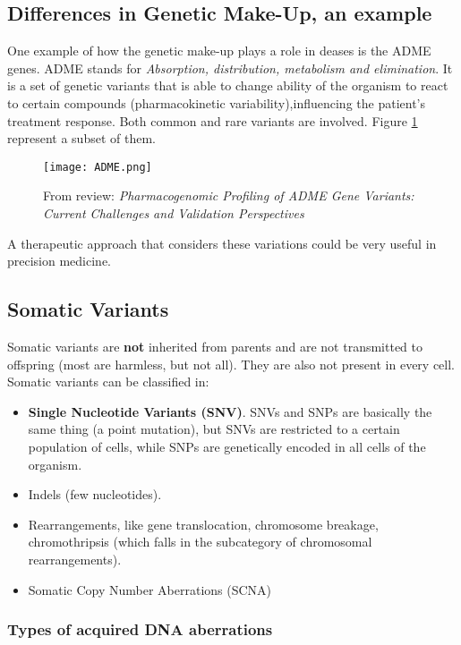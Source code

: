 \subsection{Differences in Genetic Make-Up, an example}
One example of how the genetic make-up plays a role in deases is the ADME genes.
ADME stands for \textit{Absorption, distribution, metabolism and elimination}.
It is a set of genetic variants that is able to change ability of the organism to react to certain compounds (pharmacokinetic variability),influencing the patient's treatment response. Both common and rare variants are involved. Figure \ref{fig:adme} represent a subset of them.
\begin{figure}[H]
    \centering
    \texttt{[image: ADME.png]}
    \caption{From review: \textit{Pharmacogenomic Profiling of ADME Gene Variants:
Current Challenges and Validation Perspectives}}
\label{fig:adme}
\end{figure}

A therapeutic approach that considers these variations could be very useful in precision medicine.

\subsection{Somatic Variants}
Somatic variants are \textbf{not} inherited from parents and are not transmitted to offspring (most are harmless, but not all). They are also not present in every cell.\\
Somatic variants can be classified in:

\begin{itemize}
\item \textbf{Single Nucleotide Variants (SNV)}. SNVs and SNPs are basically the same thing (a point mutation), but SNVs are restricted to a certain population of cells, while SNPs are genetically encoded in all cells of the organism.
\item Indels (few nucleotides).
\item Rearrangements, like gene translocation, chromosome breakage, chromothripsis (which falls in the subcategory of chromosomal rearrangements).
\item Somatic Copy Number Aberrations (SCNA)
\end{itemize}


		\subsubsection{Types of acquired DNA aberrations} \label{subsec:aberrations}


